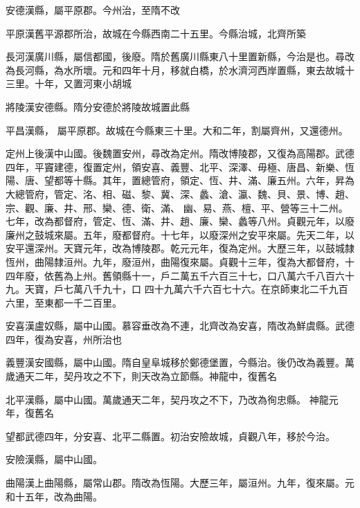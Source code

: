 \begin{pinyinscope}
 安德漢縣，屬平原郡。今州治，至隋不改



 平原漢舊平源郡所治，故城在今縣西南二十五里。今縣治城，北齊所築



 長河漢廣川縣，屬信都國，後廢。隋於舊廣川縣東八十里置新縣，今治是也。尋改為長河縣，為水所壞。元和四年十月，移就白橋，於水濟河西岸置縣，東去故城十三里。十年，又置河東小胡城



 將陵漢安德縣。隋分安德於將陵故城置此縣



 平昌漢縣，
 屬平原郡。故城在今縣東三十里。大和二年，割屬齊州，又還德州。



 定州上後漢中山國。後魏置安州，尋改為定州。隋改博陵郡，又復為高陽郡。武德四年，平竇建德，復置定州，領安喜、義豐、北平、深澤、毋極、唐昌、新樂、恆陽、唐、望都等十縣。其年，置總管府，領定、恆、井、滿、廉五州。六年，昇為大總管府，管定、洺、相、磁、黎、冀、深、蠡、滄、瀛、魏、貝、景、博、趙、宗、觀、廉、井、邢、欒、德、衛、滿、
 幽、易、燕、檀、平、營等三十二州。七年，改為都督府，管定、恆、滿、井、趙、廉、欒、蠡等八州。貞觀元年，以廢廉州之鼓城來屬。五年，廢都督府。十七年，以廢深州之安平來屬。先天二年，以安平還深州。天寶元年，改為博陵郡。乾元元年，復為定州。大歷三年，以鼓城隸恆州，曲陽隸洹州。九年，廢洹州，曲陽復來屬。貞觀十三年，復為大都督府，十四年廢，依舊為上州。舊領縣十一，戶二萬五千六百三十七，口八萬六千八百六十九。天寶，戶七萬八千九十，口
 四十九萬六千六百七十六。在京師東北二千九百六里，至東都一千二百里。



 安喜漢盧奴縣，屬中山國。慕容垂改為不連，北齊改為安喜，隋改為鮮虞縣。武德四年，復為安喜，州所治也



 義豐漢安國縣，屬中山國。隋自皇阜城移於鄭德堡置，今縣治。後仍改為義豐。萬歲通天二年，契丹攻之不下，則天改為立節縣。神龍中，復舊名



 北平漢縣，屬中山國。萬歲通天二年，契丹攻之不下，乃改為徇忠縣。
 神龍元年，復舊名



 望都武德四年，分安喜、北平二縣置。初治安險故城，貞觀八年，移於今治。



 安險漢縣，屬中山國。



 曲陽漢上曲陽縣，屬常山郡。隋改為恆陽。大歷三年，屬洹州。九年，復來屬。元和十五年，改為曲陽。




\end{pinyinscope}
